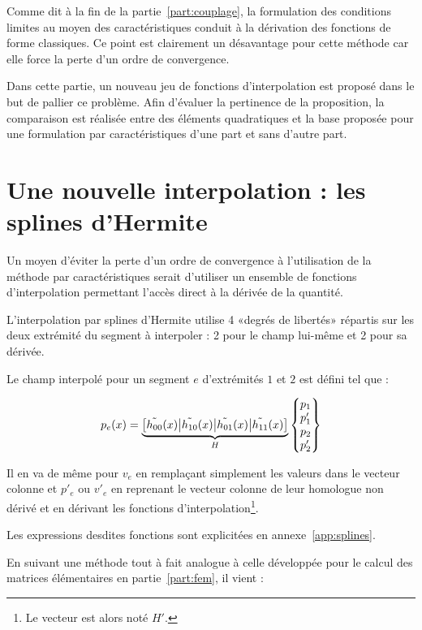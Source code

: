 Comme dit à la fin de la partie~\ref{part:couplage}, la formulation des conditions limites au moyen des
caractéristiques conduit à la dérivation des fonctions de forme classiques. Ce point est clairement un désavantage pour
cette méthode car elle force la perte d'un ordre de convergence.

Dans cette partie, un nouveau jeu de fonctions d'interpolation est proposé dans le but de pallier ce problème. Afin
d'évaluer la pertinence de la proposition, la comparaison est réalisée entre des éléments quadratiques et la base
proposée pour une formulation par caractéristiques d'une part et sans d'autre part.

\section{Une nouvelle interpolation : les splines d'Hermite}

Un moyen d'éviter la perte d'un ordre de convergence à l'utilisation de la méthode par caractéristiques serait
d'utiliser un ensemble de fonctions d'interpolation permettant l'accès direct à la dérivée de la quantité.

L'interpolation par splines d'Hermite utilise 4 «degrés de libertés» répartis sur les deux extrémité du segment à
interpoler : 2 pour le champ lui-même et 2 pour sa dérivée.

Le champ interpolé pour un segment $e$ d'extrémités $1$ et $2$ est défini tel que :

\begin{equation*}
	p_e(x) = \underbrace{\left[\tilde{h_{00}}(x)\big|\tilde{h_{10}}(x)\big|\tilde{h_{01}}(x)\big|\tilde{h_{11}}(x)\right]}_{H}\begin{Bmatrix}p_1\\p'_1\\p_2\\p'_2\end{Bmatrix}
\end{equation*}

Il en va de même pour $v_e$ en remplaçant simplement les valeurs dans le vecteur colonne et $p'_e$ ou $v'_e$ en
reprenant le vecteur colonne de leur homologue non dérivé et en dérivant les fonctions d'interpolation\footnote{Le
vecteur est alors noté $H'$.}.

Les expressions desdites fonctions sont explicitées en annexe~\ref{app:splines}.

En suivant une méthode tout à fait analogue à celle développée pour le calcul des matrices élémentaires en partie~\ref{part:fem}, il vient :

